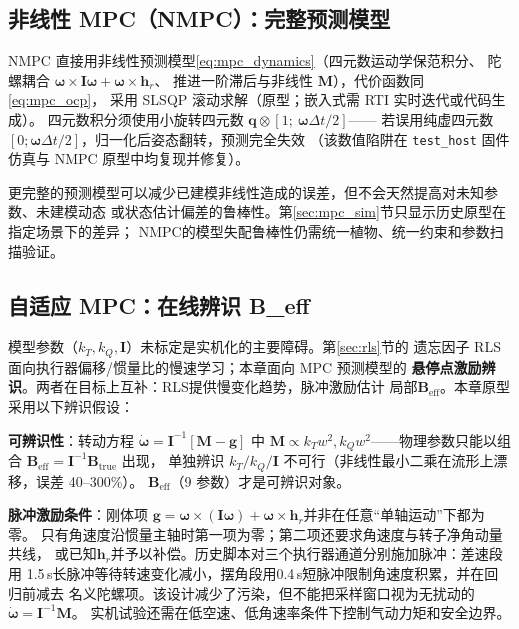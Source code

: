 \subsection{非线性 MPC（NMPC）：完整预测模型}
\label{sec:nmpc}

NMPC 直接用非线性预测模型\eqref{eq:mpc_dynamics}（四元数运动学保范积分、
陀螺耦合 $\boldsymbol{\omega}\times\mathbf{I}\boldsymbol{\omega}+\boldsymbol{\omega}\times\mathbf{h}_r$、
推进一阶滞后与非线性 $\boldsymbol{M}$），代价函数同\eqref{eq:mpc_ocp}，
采用 SLSQP 滚动求解（原型；嵌入式需 RTI 实时迭代或代码生成）。
四元数积分须使用小旋转四元数 $\mathbf{q}\otimes[1;\ \boldsymbol{\omega}\Delta t/2]$——
若误用纯虚四元数 $[0;\boldsymbol{\omega}\Delta t/2]$，归一化后姿态翻转，预测完全失效
（该数值陷阱在 \texttt{test\_host} 固件仿真与 NMPC 原型中均复现并修复）。

更完整的预测模型可以减少已建模非线性造成的误差，但不会天然提高对未知参数、未建模动态
或状态估计偏差的鲁棒性。第\ref{sec:mpc_sim}节只显示历史原型在指定场景下的差异；
NMPC的模型失配鲁棒性仍需统一植物、统一约束和参数扫描验证。

\subsection{自适应 MPC：在线辨识 B\_eff}
\label{sec:mpc_adapt}

模型参数（$k_T,k_Q,\mathbf{I}$）未标定是实机化的主要障碍。第\ref{sec:rls}节的
遗忘因子 RLS 面向执行器偏移/惯量比的慢速学习；本章面向 MPC 预测模型的
\textbf{悬停点激励辨识}。两者在目标上互补：RLS提供慢变化趋势，脉冲激励估计
局部$\mathbf{B}_{\mathrm{eff}}$。本章原型采用以下辨识假设：

\textbf{可辨识性}：转动方程 $\dot{\boldsymbol{\omega}} = \mathbf{I}^{-1}[\boldsymbol{M}-\boldsymbol{g}]$
中 $\boldsymbol{M}\propto k_T w^2, k_Q w^2$——物理参数只能以组合
$\mathbf{B}_{\mathrm{eff}}=\mathbf{I}^{-1}\mathbf{B}_{\mathrm{true}}$ 出现，
单独辨识 $k_T/k_Q/\mathbf{I}$ 不可行（非线性最小二乘在流形上漂移，误差 40--300\%）。
$\mathbf{B}_{\mathrm{eff}}$（9 参数）才是可辨识对象。

\textbf{脉冲激励条件}：刚体项
$\boldsymbol{g}=\boldsymbol{\omega}\times(\mathbf{I}\boldsymbol{\omega})+
\boldsymbol{\omega}\times\mathbf{h}_r$并非在任意“单轴运动”下都为零。
只有角速度沿惯量主轴时第一项为零；第二项还要求角速度与转子净角动量共线，
或已知$\mathbf h_r$并予以补偿。历史脚本对三个执行器通道分别施加脉冲：差速段用
1.5\,s长脉冲等待转速变化减小，摆角段用0.4\,s短脉冲限制角速度积累，并在回归前减去
名义陀螺项。该设计减少了污染，但不能把采样窗口视为无扰动的
$\dot{\boldsymbol\omega}=\mathbf I^{-1}\boldsymbol M$。
实机试验还需在低空速、低角速率条件下控制气动力矩和安全边界。

